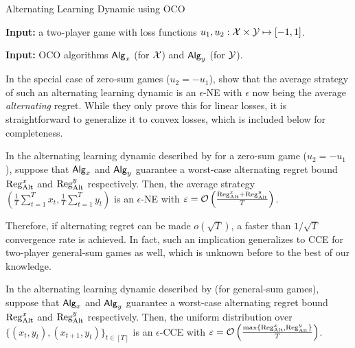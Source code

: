 \begin{algorithm}[tb]
   \caption{Alternating Learning Dynamic using OCO}
   \label{alg:alternation}

   {\bfseries Input:} a two-player game with loss functions $u_1, u_2: {\mathcal{X}}\times{\mathcal{Y}}\mapsto[-1,1]$.
   
   {\bfseries Input:} OCO algorithms ${\mathsf{Alg}}_x$ (for ${\mathcal{X}}$) and ${\mathsf{Alg}}_y$ (for ${\mathcal{Y}}$).
   
\end{algorithm}

In the special case of zero-sum games ($u_2=-u_1$),
\citet{wibisono2022alternating, cevher2024alternation} show that the average strategy of such an alternating learning dynamic is an $\epsilon$-NE with $\epsilon$ now being the average \emph{alternating} regret.
While they only prove this for linear losses, it is straightforward to generalize it to convex losses, which is included below for completeness.

\begin{theorem}\label{thm:zero-sum}
In the alternating learning dynamic described by  for a zero-sum game ($u_2=-u_1$), 
suppose that ${\mathsf{Alg}}_x$ and ${\mathsf{Alg}}_y$ 
guarantee a worst-case alternating regret bound $\mathrm{Reg}_{\mathrm{Alt}}^x$ and $\mathrm{Reg}_{\mathrm{Alt}}^y$ respectively.
Then, the average strategy $(\frac{1}{T}\sum_{t=1}^T x_t, \frac{1}{T}\sum_{t=1}^T y_t)$ is an $\epsilon$-NE with $\varepsilon = \mathcal{O}\left(\frac{\mathrm{Reg}_{\mathrm{Alt}}^x+\mathrm{Reg}_{\mathrm{Alt}}^y}{T}\right)$.
\end{theorem}

Therefore, if alternating regret can be made $o(\sqrt{T})$, a faster than $1/\sqrt{T}$ convergence rate is achieved.
In fact, such an implication generalizes to CCE for two-player general-sum games as well, which is unknown before to the best of our knowledge.

\begin{theorem}\label{thm:general-sum}
In the alternating learning dynamic described by  (for general-sum games), suppose that ${\mathsf{Alg}}_x$ and ${\mathsf{Alg}}_y$ 
guarantee a worst-case alternating regret bound $\mathrm{Reg}_{\mathrm{Alt}}^x$ and $\mathrm{Reg}_{\mathrm{Alt}}^y$ respectively.
Then, the uniform distribution over $\{(x_t,y_t), (x_{t+1},y_t)\}_{t\in[T]}$ is an $\epsilon$-CCE with $\varepsilon = \mathcal{O}\left(\frac{\max\{\mathrm{Reg}_{\mathrm{Alt}}^x,\mathrm{Reg}_{\mathrm{Alt}}^y\}}{T}\right)$.
\end{theorem}

